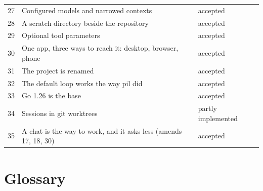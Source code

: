 {\begin{longtable}{@{}lp{9.4cm}l@{}}
27 & Configured models and narrowed contexts & accepted \\
28 & A scratch directory beside the repository & accepted \\
29 & Optional tool parameters & accepted \\
30 & One app, three ways to reach it: desktop, browser, phone & accepted \\
31 & The project is renamed \nodwyn{} & accepted \\
32 & The default loop works the way pil did & accepted \\
33 & Go 1.26 is the base & accepted \\
34 & Sessions in git worktrees & partly implemented \\
35 & A chat is the way to work, and it asks less (amends 17, 18, 30) & accepted \\
\bottomrule
\end{longtable}}

\chapter{Glossary}

